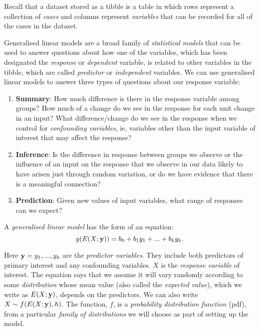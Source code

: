 \documentclass[
]{article}
\begin{document}
Recall that a dataset stored as a tibble is a table in which rows
represent a collection of \emph{cases} and columns represent
\emph{variables} that can be recorded for all of the cases in the
dataset.

Generalised linear models are a broad family of \emph{statistical
models} that can be used to answer questions about how one of the
variables, which has been designated the \emph{response} or
\emph{dependent} variable, is related to other variables in the tibble,
which are called \emph{predictor} or \emph{independent} variables. We
can use generalised linear models to answer three types of questions
about our response variable:

\begin{enumerate}
\def\labelenumi{\arabic{enumi}.}
\item
  \textbf{Summary}: How much difference is there in the response
  variable among groups? How much of a change do we see in the response
  for each unit change in an input? What difference/change do we see in
  the response when we control for \emph{confounding variables}, ie,
  variables other than the input variable of interest that may affect
  the response?
\item
  \textbf{Inference}: Is the difference in response between groups we
  observe or the influence of an input on the response that we observe
  in our data likely to have arisen just through random variation, or do
  we have evidence that there is a meaningful connection?
\item
  \textbf{Prediction}: Given new values of input variables, what range
  of responses can we expect?
\end{enumerate}

A \emph{generalised linear model} has the form of an equation:\\
\[
g(E(X;{\bf y})) = b_0 +b_1 y_1 + ... + b_k y_k.
\]

Here \({\bf y} = y_1, ... , y_k\) are the \emph{predictor variables}.
They include both predictors of primary interest and any confounding
variables. \(X\) is the \emph{response variable} of interest. The
equation says that we assume it will vary randomly according to some
\emph{distribution} whose mean value (also called the \emph{expected
value}), which we write as \(E(X;{\bf y})\), depends on the predictors.
We can also write \(X \sim f(E(X;{\bf y}),h)\). The function, \(f\), is
a \emph{probability distribution function} (pdf), from a particular
\emph{family of distributions} we will choose as part of setting up the
model.
\end{document}
